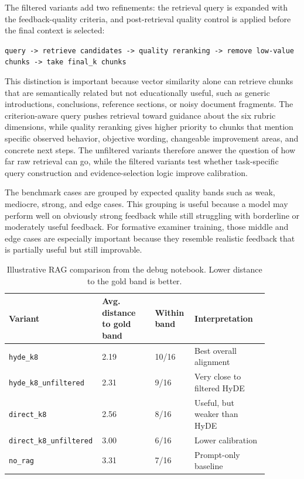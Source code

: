 The filtered variants add two refinements: the retrieval query is expanded with
the feedback-quality criteria, and post-retrieval quality control is applied
before the final context is selected:

\begin{center}
\texttt{query -> retrieve candidates -> quality reranking -> remove low-value chunks -> take final\_k chunks}
\end{center}

This distinction is important because vector similarity alone can retrieve
chunks that are semantically related but not educationally useful, such as
generic introductions, conclusions, reference sections, or noisy document
fragments. The criterion-aware query pushes retrieval toward guidance about the
six rubric dimensions, while quality reranking gives higher priority to chunks
that mention specific observed behavior, objective wording, changeable
improvement areas, and concrete next steps. The unfiltered variants therefore
answer the question of how far raw retrieval can go, while the filtered variants
test whether task-specific query construction and evidence-selection logic
improve calibration.

The benchmark cases are grouped by expected quality bands such as weak,
mediocre, strong, and edge cases. This grouping is useful because a model may
perform well on obviously strong feedback while still struggling with borderline
or moderately useful feedback. For formative examiner training, those middle and
edge cases are especially important because they resemble realistic feedback
that is partially useful but still improvable.

\begin{table}[H]
    \centering
    \small
    \begin{tabular}{L{0.25\linewidth}L{0.20\linewidth}L{0.15\linewidth}L{0.28\linewidth}}
        \toprule
        Variant & Avg. distance to gold band & Within band & Interpretation \\
        \midrule
        \texttt{hyde\_k8} & 2.19 & 10/16 & Best overall alignment \\
        \texttt{hyde\_k8\_unfiltered} & 2.31 & 9/16 & Very close to filtered HyDE \\
        \texttt{direct\_k8} & 2.56 & 8/16 & Useful, but weaker than HyDE \\
        \texttt{direct\_k8\_unfiltered} & 3.00 & 6/16 & Lower calibration \\
        \texttt{no\_rag} & 3.31 & 7/16 & Prompt-only baseline \\
        \bottomrule
    \end{tabular}
    \caption{Illustrative RAG comparison from the debug notebook. Lower
    distance to the gold band is better.}
    \label{tab:rag-variant-comparison}
\end{table}

